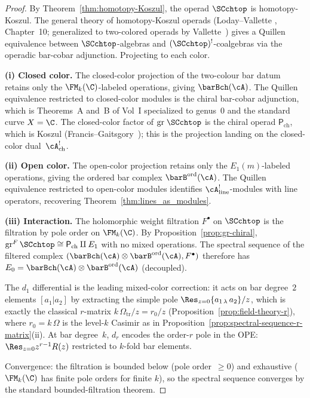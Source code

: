 \begin{proof}
By Theorem~\ref{thm:homotopy-Koszul}, the operad $\SCchtop$
is homotopy-Koszul. The general theory of homotopy-Koszul
operads (Loday--Vallette \cite{LV12}, Chapter~10; generalized
to two-colored operads by Vallette~\cite{Val07}) gives a Quillen
equivalence between $\SCchtop$-algebras and
$(\SCchtop)^!$-coalgebras via the operadic bar-cobar
adjunction. Projecting to each color.

\medskip
\noindent\textbf{(i) Closed color.}
The closed-color projection of the two-colour bar datum retains
only the $\FM_k(\C)$-labeled operations, giving $\barBch(\cA)$.
The Quillen equivalence restricted to closed-color modules is
the chiral bar-cobar adjunction, which is Theorems~A and~B
of Vol~I specialized to genus~$0$ and the standard curve
$X = \C$. The closed-color factor of
$\mathrm{gr}\;\SCchtop$ is the chiral operad
$\mathsf{P}_{\mathrm{ch}}$, which is Koszul
(Francis--Gaitsgory~\cite{FG12}); this is the projection
landing on the closed-color dual~$\cA^!_{\mathrm{ch}}$.

\medskip
\noindent\textbf{(ii) Open color.}
The open-color projection retains only the
$E_1(m)$-labeled operations, giving the ordered bar complex
$\barB^{\mathrm{ord}}(\cA)$. The Quillen equivalence
restricted to open-color modules identifies
$\cA^!_{\mathrm{line}}$-modules with line operators, recovering
Theorem~\ref{thm:lines_as_modules}.

\medskip
\noindent\textbf{(iii) Interaction.}
The holomorphic weight filtration $F^\bullet$ on $\SCchtop$ is
the filtration by pole order on $\FM_k(\C)$. By
Proposition~\ref{prop:gr-chiral},
$\mathrm{gr}^F\,\SCchtop \cong \mathsf{P}_{\mathrm{ch}}
\amalg E_1$ with no mixed operations. The spectral sequence of
the filtered complex $(\barBch(\cA) \otimes \barB^{\mathrm{ord}}(\cA), F^\bullet)$
therefore has $E_0 = \barBch(\cA) \otimes
\barB^{\mathrm{ord}}(\cA)$ (decoupled).

The $d_1$ differential is the leading mixed-color correction:
it acts on bar degree~$2$ elements $[a_1 | a_2]$ by extracting
the simple pole $\Res_{z=0} \{a_{1\,\lambda}\, a_2\}/z$,
which is exactly the classical $r$-matrix $k\,\Omega_{\mathrm{tr}}/z = r_0/z$
(Proposition~\ref{prop:field-theory-r}), where $r_0 = k\,\Omega$
is the level-$k$ Casimir as in
Proposition~\ref{prop:spectral-sequence-r-matrix}(ii). At bar degree~$k$,
$d_r$ encodes the order-$r$ pole in the OPE:
$\Res_{z=0} z^{r-1} R(z)$ restricted to $k$-fold bar elements.

Convergence: the filtration is bounded below
(pole order~$\ge 0$) and exhaustive ($\FM_k(\C)$ has finite
pole orders for finite $k$), so the spectral sequence converges
by the standard bounded-filtration theorem.


\end{proof}

